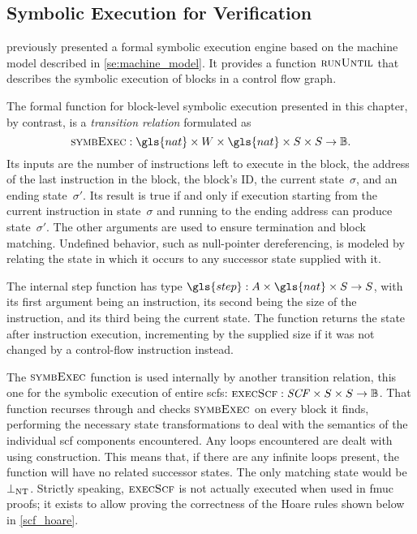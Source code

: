 \subsection{Symbolic Execution for Verification}\label{sse:syntax_ver_symb}
 previously presented a formal symbolic execution engine
based on the machine model described in \cref{se:machine_model}.
It provides a function $\operatorname{\textsc{runUntil}}$ that describes the symbolic execution of
blocks in a control flow graph.

The formal function for block-level symbolic execution presented in this chapter,%
by contrast, is a \emph{transition relation}%
 formulated as
\begin{equation*}
  \execblock:\gls{nat}\times W\times\gls{nat}\times S\times S\rightarrow\mathbb{B}.
\end{equation*}
Its inputs are the number of instructions left to execute in the block,
the address of the last instruction in the block, the block's ID,
the current state~$\sigma$, and an ending state~$\sigma'$.
Its result is true if and only if execution
starting from the current instruction in state~$\sigma$
and running to the ending address can produce state~$\sigma'$.
The other arguments are used to ensure termination and block matching.
Undefined behavior, such as null-pointer dereferencing,
is modeled by relating the state in which it occurs to any successor state
supplied with it.

The internal step function has type $\gls{step}:A\times\gls{nat}\times S\rightarrow S$,
with its first argument being an instruction, its second being the size of the instruction,
and its third being the current state.
The function returns the state after instruction execution,
incrementing  by the supplied size
if it was not changed by a control-flow instruction instead.

The $\operatorname{\textsc{symbExec}}$ function is used internally by another transition relation,
this one for the symbolic execution of entire \acp{scf}:
$\operatorname{\textsc{execScf}}:\mathit{SCF}\times S\times S\rightarrow\mathbb{B}$.
That function recurses through 
and checks $\operatorname{\textsc{symbExec}}$ on every block it finds,
performing the necessary state transformations to deal with the semantics of
the individual \ac{scf} components encountered.
Any loops encountered are dealt with using  construction.
This means that, if there are any infinite loops present,
the function will have no related successor states.
The only matching state would be $\bot_\mathrm{NT}$.
Strictly speaking, $\operatorname{\textsc{execScf}}$ is not actually executed when used in \ac{fmuc} proofs;
it exists to allow proving the correctness
of the Hoare rules shown below in \cref{scf_hoare}.

